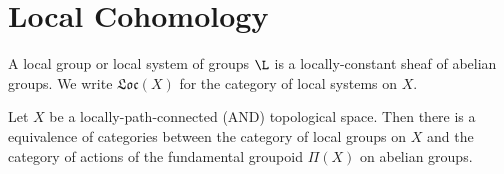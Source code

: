 \documentclass[12pt]{article}
\newcommand{\Loc}[1]{\mathfrak{Loc}\left( #1 \right)}
\begin{document}
\tableofcontents


\section{Local Cohomology}

\begin{definition}
A local group or local system of groups $\L$ is a locally-constant sheaf of abelian groups. We write $\Loc{X}$ for the category of local systems on $X$.  
\end{definition}

\begin{theorem}
Let $X$ be a locally-path-connected (AND) topological space. Then there is a equivalence of categories between the category of local groups on $X$ and the category of actions of the fundamental groupoid $\Pi(X)$ on abelian groups. 
\end{theorem}
\end{document}
